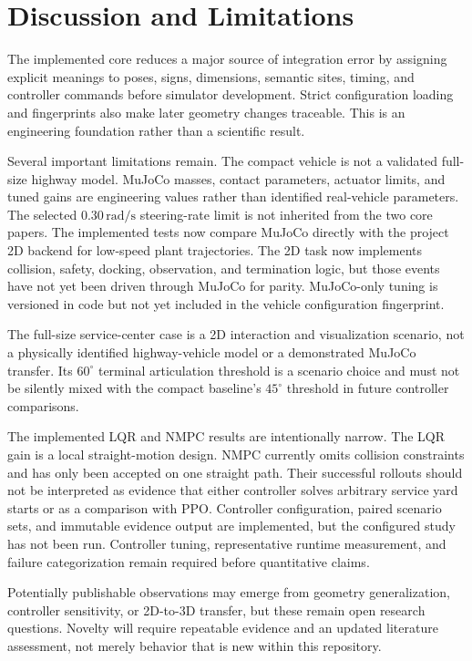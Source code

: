 \section{Discussion and Limitations}

The implemented core reduces a major source of integration error by assigning
explicit meanings to poses, signs, dimensions, semantic sites, timing, and
controller commands before simulator development. Strict configuration loading
and fingerprints also make later geometry changes traceable. This is an
engineering foundation rather than a scientific result.

Several important limitations remain. The compact vehicle is not a validated
full-size highway model. MuJoCo masses, contact parameters, actuator limits,
and tuned gains are engineering values rather than identified real-vehicle
parameters. The selected $0.30\,\mathrm{rad/s}$ steering-rate limit is not
inherited from the two core papers. The implemented tests now compare MuJoCo
directly with the project 2D backend for low-speed plant trajectories. The 2D
task now implements collision, safety, docking, observation, and termination
logic, but those events have not yet been driven through MuJoCo for parity.
MuJoCo-only tuning is versioned in code but not yet included in the vehicle
configuration fingerprint.

The full-size service-center case is a 2D interaction and visualization
scenario, not a physically identified highway-vehicle model or a demonstrated
MuJoCo transfer. Its $60^\circ$ terminal articulation threshold is a scenario
choice and must not be silently mixed with the compact baseline's $45^\circ$
threshold in future controller comparisons.

The implemented LQR and NMPC results are intentionally narrow. The LQR gain is
a local straight-motion design. NMPC currently omits collision constraints and
has only been accepted on one straight path. Their successful rollouts should
not be interpreted as evidence that either controller solves arbitrary service
yard starts or as a comparison with PPO. Controller configuration, paired
scenario sets, and immutable evidence output are implemented, but the
configured study has not been run. Controller tuning, representative runtime
measurement, and failure categorization remain required before quantitative
claims.

Potentially publishable observations may emerge from geometry generalization,
controller sensitivity, or 2D-to-3D transfer, but these remain open research
questions. Novelty will require repeatable evidence and an updated literature
assessment, not merely behavior that is new within this repository.
